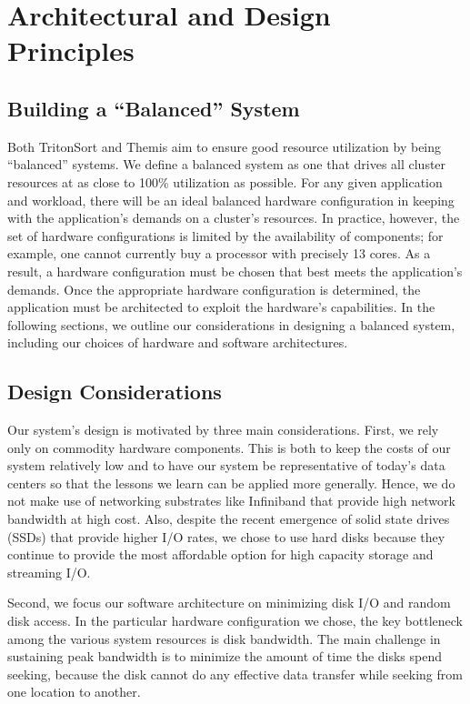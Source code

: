 \chapter{Architectural and Design Principles}
\label{chapter:principles}

\section{Building a ``Balanced'' System}

Both TritonSort and Themis aim to ensure good resource utilization by being
``balanced'' systems. We define a balanced system as one that drives all
cluster resources at as close to 100\% utilization as possible. For any given
application and workload, there will be an ideal balanced hardware
configuration in keeping with the application's demands on a cluster's
resources. In practice, however, the set of hardware configurations is limited
by the availability of components; for example, one cannot currently buy a
processor with precisely 13 cores. As a result, a hardware configuration must
be chosen that best meets the application's demands.  Once the appropriate
hardware configuration is determined, the application must be architected to
exploit the hardware's capabilities. In the following sections, we outline our
considerations in designing a balanced system, including our choices of
hardware and software architectures.

\section{Design Considerations}

Our system's design is motivated by three main considerations.  First, we rely
only on commodity hardware components.  This is both to keep the costs of our
system relatively low and to have our system be representative of today's data
centers so that the lessons we learn can be applied more generally.  Hence, we
do not make use of networking substrates like Infiniband that provide high
network bandwidth at high cost.  Also, despite the recent emergence of solid
state drives (SSDs) that provide higher I/O rates, we chose to use hard disks
because they continue to provide the most affordable option for high capacity
storage and streaming I/O.

Second, we focus our software architecture on minimizing disk I/O and random
disk access.  In the particular hardware configuration we chose, the key
bottleneck among the various system resources is disk bandwidth.  The main
challenge in sustaining peak bandwidth is to minimize the amount of time the
disks spend seeking, because the disk cannot do any effective data transfer
while seeking from one location to another.

